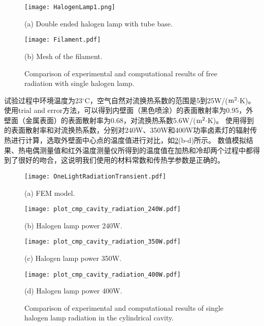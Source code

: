 \begin{figure}
  \begin{minipage}[t]{0.5\linewidth} %
  \nonumber
    \centering
    \texttt{[image: HalogenLamp1.png]}
    \centerline{(a) Double ended halogen lamp with tube base.}
    \label{Fig:HalogenLamp1}
  \end{minipage}%
  \begin{minipage}[t]{0.5\linewidth}
    \centering
    \texttt{[image: Filament.pdf]}
    \centerline{(b) Mesh of the filament.}
  \end{minipage}
  \caption{Comparison of experimental and computational results of free radiation with single halogen lamp.}
  \label{Fig:Filament}
\end{figure}

试验过程中环境温度为23$^{\circ}$C，空气自然对流换热系数的范围是5到25W/(${\rm{m}}^2\cdot$K)。
使用trial and error方法，可以得到内壁面（黑色喷涂）的表面散射率为0.95，外壁面（金属表面）的表面散射率为0.68，对流换热系数5.6W/(${\rm{m}}^2\cdot$K)。
使用得到的表面散射率和对流换热系数，分别对240W、350W和400W功率卤素灯的辐射传热进行计算，选取外壁面中心点的温度值进行对比，如\ref{Fig:OneLightRadiationSimulation}(b-d)所示。
数值模拟结果、热电偶测量值和红外温度测量仪所得到的温度值在加热和冷却两个过程中都得到了很好的吻合，这说明我们使用的材料常数和传热学参数是正确的。

\begin{figure}
  \begin{minipage}[t]{0.5\linewidth} %
  \nonumber
    \centering
    \texttt{[image: OneLightRadiationTransient.pdf]}
    \centerline{(a) FEM model.}
    \label{Fig:OneLightRadiationTransient}
  \end{minipage}%
  \begin{minipage}[t]{0.5\linewidth}
    \centering
    \texttt{[image: plot\_cmp\_cavity\_radiation\_240W.pdf]}
    \centerline{(b) Halogen lamp power 240W.}
    \label{Fig:Compare240W}
  \end{minipage}

    \begin{minipage}[t]{0.5\linewidth} %
  \nonumber
    \centering
    \texttt{[image: plot\_cmp\_cavity\_radiation\_350W.pdf]}
    \centerline{(c) Halogen lamp power 350W.}
    \label{Fig:Compare350W}
  \end{minipage}%
  \begin{minipage}[t]{0.5\linewidth}
    \centering
    \texttt{[image: plot\_cmp\_cavity\_radiation\_400W.pdf]}
    \centerline{(d) Halogen lamp power 400W.}
    \label{Fig:Compare400W}
  \end{minipage}
  \caption{Comparison of experimental and computational results of single halogen lamp radiation in the cylindrical cavity.}
  \label{Fig:OneLightRadiationSimulation}
\end{figure}



